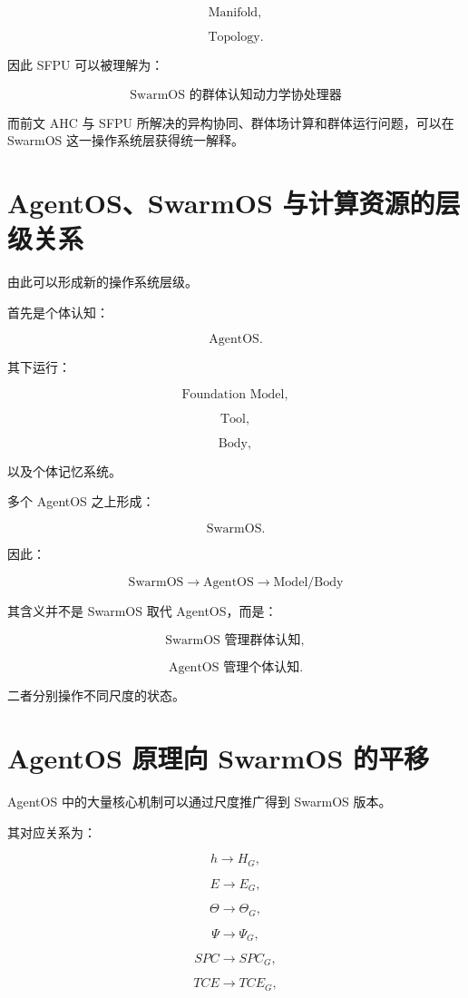 \[
\text{Manifold},
\]

\[
\text{Topology}.
\]

因此 SFPU 可以被理解为：

\[
\boxed{
\text{SwarmOS 的群体认知动力学协处理器}
}
\]

而前文 AHC 与 SFPU 所解决的异构协同、群体场计算和群体运行问题，可以在 SwarmOS 这一操作系统层获得统一解释。


\section{AgentOS、SwarmOS 与计算资源的层级关系}

由此可以形成新的操作系统层级。

首先是个体认知：

\[
\mathrm{AgentOS}.
\]

其下运行：

\[
\text{Foundation Model},
\]

\[
\text{Tool},
\]

\[
\text{Body},
\]

以及个体记忆系统。

多个 AgentOS 之上形成：

\[
\mathrm{SwarmOS}.
\]

因此：

\[
\boxed{
\mathrm{SwarmOS}
\rightarrow
\mathrm{AgentOS}
\rightarrow
\mathrm{Model/Body}
}
\]

其含义并不是 SwarmOS 取代 AgentOS，而是：

\[
\text{SwarmOS 管理群体认知},
\]

\[
\text{AgentOS 管理个体认知}.
\]

二者分别操作不同尺度的状态。


\section{AgentOS 原理向 SwarmOS 的平移}

AgentOS 中的大量核心机制可以通过尺度推广得到 SwarmOS 版本。

其对应关系为：

\[
h
\rightarrow
H_G,
\]

\[
E
\rightarrow
E_G,
\]

\[
\Theta
\rightarrow
\Theta_G,
\]

\[
\Psi
\rightarrow
\Psi_G,
\]

\[
SPC
\rightarrow
SPC_G,
\]

\[
TCE
\rightarrow
TCE_G,
\]

